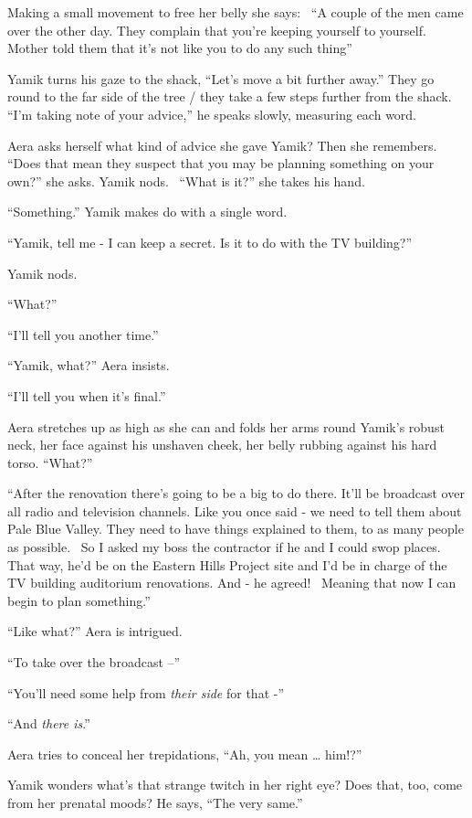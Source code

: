 \documentclass[twoside,11pt]{book}
\begin{document}
Making a small movement to free her belly she says: \ ``A couple of the men came over the other day. They
complain that you're keeping yourself to yourself. Mother told them that it's not like you to do any such
thing''

Yamik turns his gaze to the shack, ``Let's move a bit further away.'' They go round to the far
side of the tree / they take a few steps further from the shack. ``I'm taking note of your
advice,'' he speaks slowly, measuring each word.

Aera asks herself what kind of advice she gave Yamik? Then she remembers. ``Does that mean they suspect
that you may be planning something on your own?'' she asks. Yamik nods. \ ``What is
it?'' she takes his hand.

``Something.'' Yamik makes do with a single word.

``Yamik, tell me - I can keep a secret. Is it to do with the TV building?''

Yamik nods.

``What?''

``I'll tell you another time.''

``Yamik, what?'' Aera insists.

``I'll tell you when it's final.''

Aera stretches up as high as she can and folds her arms round Yamik's robust neck, her face against his unshaven cheek,
her belly rubbing against his hard torso. ``What?''

``After the renovation there's going to be a big to do there. It'll be broadcast over all radio and
television channels. Like you once said - we need to tell them about Pale Blue Valley. They need to have things
explained to them, to as many people as possible. \ So I asked my boss the contractor if he and I could swop places.
That way, he'd be on the Eastern Hills Project site and I'd be in charge of the TV building auditorium renovations. And
- he agreed! \ Meaning that now I can begin to plan something.''

``Like what?'' Aera is intrigued.

``To take over the broadcast --''

``You'll need some help from \textit{their side }for that -''

``And \textit{there is}.''

Aera tries to conceal her trepidations, ``Ah, you mean {\dots} him!?''

Yamik wonders what's that strange twitch in her right eye? Does that, too, come from her prenatal moods? He says,
``The very same.''
\end{document}
